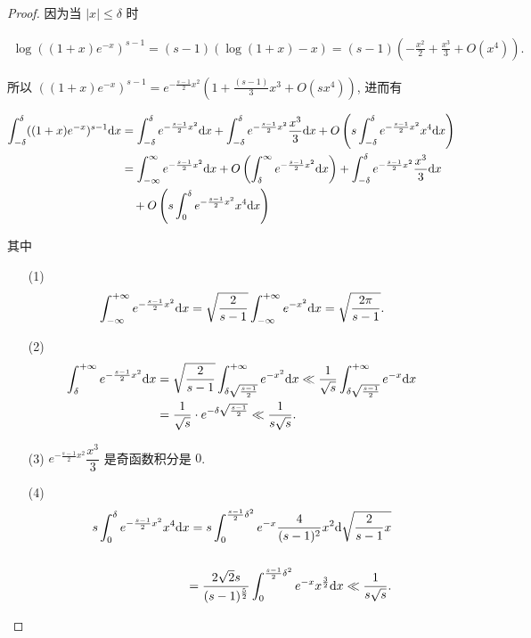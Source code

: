 \begin{proof}
	因为当 $|x| \leqslant \delta$ 时

	$
	\begin{aligned}
		\log ((1+x)e^{-x})^{s-1} = (s-1)(\log(1+x)-x) = (s-1)(-\frac{x^2}{2}+\frac{x^3}{3}+O(x^4)).
	\end{aligned}
	$

	所以 $((1+x)e^{-x})^{s-1} = e^{-\frac{s-1}{2}x^2}(1+\frac{(s-1)}{3}x^3+O(s x^4))$, 进而有

	$
	\begin{aligned}
		\int_{-\delta}^{\delta} ((1+x)e^{-x})^{s-1} \text {d} x & = \int_{-\delta}^{\delta} e^{-\frac{s-1}{2}x^2} \text {d} x + \int_{-\delta}^{\delta} e^{-\frac{s-1}{2}x^2}\frac{x^3}{3} \text {d} x + O\left(s\int_{-\delta}^{\delta} e^{-\frac{s-1}{2}x^2}x^4 \text {d} x\right)\\
		& = \int_{-\infty}^{\infty} e^{-\frac{s-1}{2}x^2}\text {d} x + O\left(\int_{\delta}^{\infty} e^{-\frac{s-1}{2}x^2} \text {d} x\right) + \int_{-\delta}^{\delta} e^{-\frac{s-1}{2}x^2}\frac{x^3}{3} \text {d} x\\
		&\quad  + O\left(s\int_{0}^{\delta} e^{-\frac{s-1}{2}x^2}x^4 \text {d} x\right)\\
	\end{aligned}
	$

	其中
	\begin{itemize}[leftmargin=1.5cm]
		\item[(1)]
		\begin{equation*}
			\begin{aligned}
				\int_{-\infty}^{+\infty} e^{-\frac{s-1}{2}x^2} \text {d} x = \sqrt{\frac{2}{s-1}}\int_{-\infty}^{+\infty} e^{-x^2} \text {d} x = \sqrt{\frac{2\pi}{s-1}}.
			\end{aligned}
		\end{equation*}
		\item[(2)]
		\begin{equation}\label{欧拉积分1}
			\begin{aligned}
				\int_{\delta}^{+\infty} e^{-\frac{s-1}{2}x^2} \text {d} x &= \sqrt{\frac{2}{s-1}} \int_{\delta \sqrt{\frac{s-1}{2}}}^{+\infty} e^{-x^2} \text {d} x \ll \frac{1}{\sqrt{s}}\int_{\delta \sqrt{\frac{s-1}{2}}}^{+\infty} e^{-x} \text {d} x \\
				&= \frac{1}{\sqrt{s}} \cdot e^{-\delta\sqrt{\frac{s-1}{2}}} \ll \frac{1}{s\sqrt{s}}.
			\end{aligned}
		\end{equation}
		\item[(3)] $e^{-\frac{s-1}{2}x^2}\dfrac{x^3}{3}$ 是奇函数积分是 $0$.
		\item[(4)]
		\begin{equation*}
			\begin{aligned}
				s\int_0^\delta e^{-\frac{s-1}{2}x^2} x^4 \text {d} x = s\int_0^{\frac{s-1}{2}\delta^2} e^{-x}\frac{4}{(s-1)^2}x^2 \text {d} \sqrt{\frac{2}{s-1}x}  \\ \\
				= \frac{2\sqrt{2}s}{(s-1)^{\frac{5}{2}}} \int_0^{\frac{s-1}{2}\delta^2} e^{-x} x^{\frac{3}{2}} \text {d} x \ll \frac{1}{s\sqrt{s}}.
			\end{aligned}
		\end{equation*}
	\end{itemize}


\end{proof}
